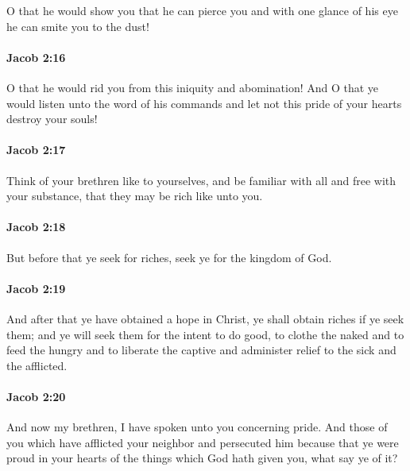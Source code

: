			O that he would show you that he can pierce you
			and with one glance of his eye he can smite you to the dust!

		\paragraph{Jacob 2:16} %
			\label{JACOB-2-16}

			O that he would rid you from this iniquity and abomination!
			And O that ye would listen unto the word of his commands
			and let not this pride of your hearts destroy your souls!

		\paragraph{Jacob 2:17} %
			\label{JACOB-2-17}

			Think of your brethren like to yourselves,
			and be familiar with all and free with your substance,
			that they may be rich like unto you.

		\paragraph{Jacob 2:18} %
			\label{JACOB-2-18}

			But before that ye seek for riches,
			seek ye for the kingdom of God.

		\paragraph{Jacob 2:19} %
			\label{JACOB-2-19}

			And after that ye have obtained a hope in Christ,
			ye shall obtain riches if ye seek them;
			and ye will seek them for the intent to do good,
			to clothe the naked and to feed the hungry
			and to liberate the captive and administer relief to the sick and the afflicted.

		\paragraph{Jacob 2:20} %
			\label{JACOB-2-20}

			And now my brethren, I have spoken unto you concerning pride.
			And those of you which have afflicted your neighbor and persecuted him
			because that ye were proud in your hearts of the things which God hath given you,
			what say ye of it?

